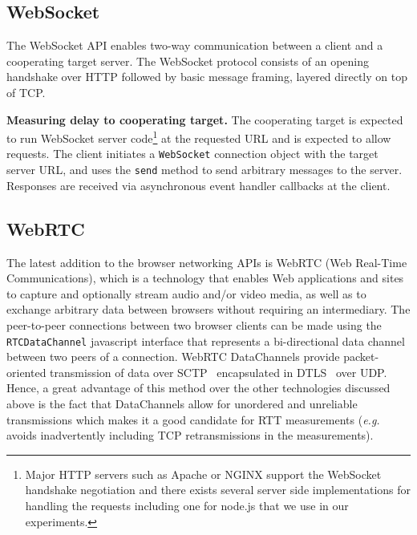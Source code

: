 \documentclass[12pt,twoside]{book}
\begin{document}
\subsection{WebSocket}

The WebSocket API enables two-way communication between a client and a cooperating target server.
 The WebSocket protocol consists of an opening handshake over HTTP followed by basic message framing, layered directly on top of TCP.

\textbf{Measuring delay to cooperating target.} The cooperating target is expected to run WebSocket server code\footnote{Major HTTP servers such as Apache or NGINX support the WebSocket handshake negotiation and there exists several server side implementations for handling the requests including one for node.js that we use in our experiments.} at the requested URL and is expected to allow requests. The client initiates a \texttt{WebSocket} connection object with the target server URL, and uses the \texttt{send} method to send arbitrary messages to the server. Responses are received via asynchronous event handler callbacks at the client.


\subsection{WebRTC}
\label{subsec:webrtc}

The latest addition to the browser networking APIs is WebRTC (Web Real-Time Communications), which is a technology that enables Web applications and sites to capture and optionally stream audio and/or video media, as well as to exchange arbitrary data between browsers without requiring an intermediary. The peer-to-peer connections between two browser clients can be made using the \texttt{RTCDataChannel} javascript interface that represents a bi-directional data channel between two peers of a connection. WebRTC DataChannels provide packet-oriented transmission of data over SCTP~\cite{sctp} encapsulated in DTLS~\cite{dtls} over UDP. Hence, a great advantage of this method over the other technologies discussed above is the fact that DataChannels allow for unordered and unreliable transmissions which makes it a good candidate for RTT measurements (\emph{e.g.} avoids inadvertently including TCP retransmissions in the measurements). 
\end{document}
